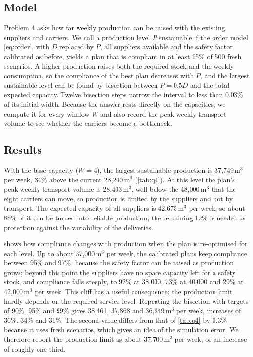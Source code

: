 \documentclass[11pt,a4paper]{article}
\begin{document}
\subsection{Model}
Problem 4 asks how far weekly production can be raised with the existing suppliers and carriers.
We call a production level $P$ sustainable if the order model \cref{eq:order}, with $D$ replaced by $P$, all suppliers available and the safety factor calibrated as before, yields a plan that is compliant in at least 95\% of 500 fresh scenarios.
A higher production raises both the required stock and the weekly consumption, so the compliance of the best plan decreases with $P$, and the largest sustainable level can be found by bisection between $P=0.5D$ and the total expected capacity.
Twelve bisection steps narrow the interval to less than 0.03\% of its initial width.
Because the answer rests directly on the capacities, we compute it for every window $W$ and also record the peak weekly transport volume to see whether the carriers become a bottleneck.

\subsection{Results}
With the base capacity ($W=4$), the largest sustainable production is 37{,}749\,m$^3$ per week, 34\% above the current 28{,}200\,m$^3$ (\cref{tab:q4}).
At this level the plan's peak weekly transport volume is 28{,}403\,m$^3$, well below the 48{,}000\,m$^3$ that the eight carriers can move, so production is limited by the suppliers and not by transport.
The expected capacity of all suppliers is 42{,}675\,m$^3$ per week, so about 88\% of it can be turned into reliable production; the remaining 12\% is needed as protection against the variability of the deliveries.

 shows how compliance changes with production when the plan is re-optimised for each level.
Up to about 37{,}000\,m$^3$ per week, the calibrated plans keep compliance between 95\% and 97\%, because the safety factor can be raised as production grows; beyond this point the suppliers have no spare capacity left for a safety stock, and compliance falls steeply, to 92\% at 38{,}000, 73\% at 40{,}000 and 29\% at 42{,}000\,m$^3$ per week.
This cliff has a useful consequence: the production limit hardly depends on the required service level.
Repeating the bisection with targets of 90\%, 95\% and 99\% gives 38{,}461, 37{,}868 and 36{,}849\,m$^3$ per week, increases of 36\%, 34\% and 31\%.
The second value differs from that of \cref{tab:q4} by 0.3\% because it uses fresh scenarios, which gives an idea of the simulation error.
We therefore report the production limit as about 37{,}700\,m$^3$ per week, or an increase of roughly one third.
\end{document}
